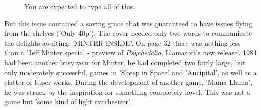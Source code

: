 \clearpage
\begin{figure}[H]
    \centering
    \begin{adjustbox}{width=13cm,center}
    \end{adjustbox}
\caption{You are expected to type all of this.}
\end{figure}
\clearpage
But this issue contained a saving grace that was guaranteed to have issues flying from the shelves ('Only 40p'). The cover needed only two
 words to communicate the delights awaiting: 'MINTER INSIDE'. On page 32 there was nothing less than a 'Jeff Minter special - preview of
\textit{Psychedelia}, Llamasoft's new release'. 1984 had been another busy year for Minter, he had completed two fairly large, but only
moderately successful, games in 'Sheep in Space' and 'Ancipital', as well as a clatter of lesser works. During the development of another
game, 'Mama Llama', he was struck by the inspiration for something completely novel. This was not a game but 'some kind of light synthesizer'.

